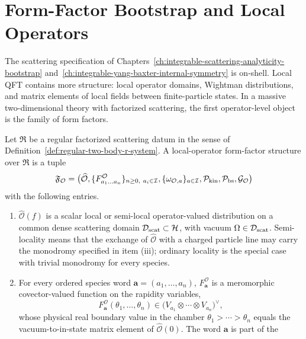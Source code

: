 \chapter{Form-Factor Bootstrap and Local Operators}
\label{ch:integrable-form-factor-bootstrap-local-operators}

\ConventionsLorentzian

The scattering specification of Chapters~\ref{ch:integrable-scattering-analyticity-bootstrap}
and~\ref{ch:integrable-yang-baxter-internal-symmetry} is on-shell.  Local QFT
contains more structure: local operator domains, Wightman distributions, and
matrix elements of local fields between finite-particle states.  In a
massive two-dimensional theory with factorized scattering, the first
operator-level object is the family of form factors.

\begin{definition}
\label{def:form-factor-datum-local-operator}
Let \(\mathfrak R\) be a regular factorized scattering datum in the sense of
Definition~\ref{def:regular-two-body-r-system}.  A local-operator
form-factor structure over \(\mathfrak R\) is a tuple
\[
  \mathfrak F_{\mathcal O}
  =
  \bigl(
    \widehat{\mathcal O},
    \{F^{\mathcal O}_{a_1\ldots a_n}\}_{n\geq0,\ a_i\in\mathcal I},
    \{\omega_{\mathcal O,a}\}_{a\in\mathcal I},
    \mathcal P_{\rm kin},
    \mathcal P_{\rm bs},
    \mathcal G_{\mathcal O}
  \bigr)
\]
with the following entries.
\begin{enumerate}[label=\textnormal{(\roman*)}]
\item \(\widehat{\mathcal O}(f)\) is a scalar local or semi-local
  operator-valued distribution on a common dense scattering domain
  \(\mathcal D_{\rm scat}\subset\mathcal H\), with vacuum
  \(\Omega\in\mathcal D_{\rm scat}\).  Semi-locality means that the exchange
  of \(\widehat{\mathcal O}\) with a charged particle line may carry the
  monodromy specified in item (iii); ordinary locality is the special case
  with trivial monodromy for every species.
\item For every ordered species word
  \(\mathbf a=(a_1,\ldots,a_n)\), \(F^{\mathcal O}_{\mathbf a}\) is a
  meromorphic covector-valued function on the rapidity variables,
  \[
    F^{\mathcal O}_{\mathbf a}(\theta_1,\ldots,\theta_n)
    \in
    \bigl(V_{a_1}\otimes\cdots\otimes V_{a_n}\bigr)^\vee ,
  \]
  whose physical real boundary value in the chamber
  \(\theta_1>\cdots>\theta_n\) equals the vacuum-to-in-state matrix element
  of \(\widehat{\mathcal O}(0)\).  The word \(\mathbf a\) is part of the

\end{enumerate}
\end{definition}
